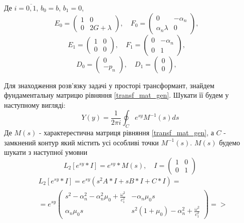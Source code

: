Де $i = \overline{0, 1}$, $b_0 = b$, $b_1 = 0$,
\begin{equation*}
    E_0 = \begin{pmatrix}
        1 & 0 \\
        0 & 2G + \lambda
    \end{pmatrix}, \quad
    F_0 = \begin{pmatrix}
        0 & -\alpha_n \\
        \alpha_n \lambda & 0
    \end{pmatrix}, \quad
\end{equation*}
\begin{equation*}
    E_1 = \begin{pmatrix}
        1 & 0 \\
        0 & 0
    \end{pmatrix}, \quad
    F_1 = \begin{pmatrix}
        0 & -\alpha_n \\
        0 & 1
    \end{pmatrix}, \quad
\end{equation*}
\begin{equation*}
    D_0 = \begin{pmatrix}
        0 \\
        -p_n
    \end{pmatrix}, \quad
    D_1 = \begin{pmatrix}
        0 \\
        0
    \end{pmatrix}, \quad
\end{equation*}

Для знаходження розв'язку задачі у просторі трансформант, знайдем фундаментальну матрицю рівняння \eqref{transf_mat_gen}.
Шукати її будем у наступному вигляді:
\begin{equation}
    Y(y) = \frac{1}{2\pi i} \oint_C e^{sy} M^{-1}(s)ds
\end{equation}
Де $M(s)$ - характерестична матриця рівняння \eqref{transf_mat_gen}, а $C$ - замкнений контур який містить усі особливі точки $M^{-1}(s)$. $M(s)$ будемо шукати з наступної умовни
\begin{equation}
    L_2\left[ e^{sy}*I \right] = e^{sy} * M(s), \quad I = \begin{pmatrix} 1 & 0 \\ 0 & 1 \end{pmatrix}
\end{equation}
\begin{align*}
    &L_2\left[ e^{sy}*I \right] = e^{sy} \left( s^2A * I + s B*I + C*I \right) = \\
    &=e^{sy} \begin{pmatrix}
        s^2 - \alpha_n^2 - \alpha_n^2\mu_0 + \frac{\omega^2}{c_1^2} & -\alpha_n \mu_0 s \\
        \alpha_n \mu_0 s & s^2 (1 + \mu_0) -\alpha_n^2 + \frac{\omega^2}{c_1^2}
     \end{pmatrix} =>
\end{align*}

